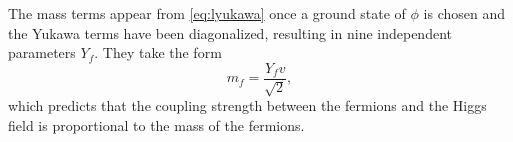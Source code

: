 The mass terms appear from \cref{eq:lyukawa} once a ground state of $\phi$ is chosen and the Yukawa terms have been diagonalized, resulting in nine independent parameters $Y_f$. 
They take the form
\begin{equation}
  m_f = \frac{Y_f v}{\sqrt{2}},
\end{equation}
which predicts that the coupling strength between the fermions and the Higgs field is proportional to the mass of the fermions.


